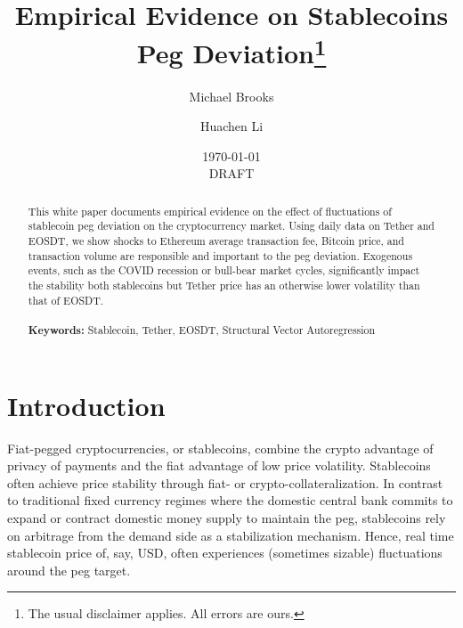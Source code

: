 \documentclass[12pt]{article}
\begin{document}
\begin{titlepage}
\title{Empirical Evidence on Stablecoins Peg Deviation\thanks{The usual disclaimer applies. All errors are ours.}}
\author{Michael Brooks \and Huachen Li}
\date{\today \\ DRAFT}


\maketitle
\begin{abstract}
\noindent This white paper documents empirical evidence on the effect of fluctuations of stablecoin peg deviation on the cryptocurrency market. Using daily data on Tether and EOSDT, we show shocks to Ethereum average transaction fee, Bitcoin price, and transaction volume are responsible and important to the peg deviation. Exogenous events, such as the COVID recession or bull-bear market cycles, significantly impact the stability both stablecoins but Tether price has an otherwise lower volatility than that of EOSDT.\\
\vspace{0in}\\
\noindent\textbf{Keywords:} Stablecoin, Tether, EOSDT, Structural Vector Autoregression\\

\bigskip
\end{abstract}
\setcounter{page}{0}
\thispagestyle{empty}
\end{titlepage}
\pagebreak \newpage




\doublespacing


\section{Introduction}
Fiat-pegged cryptocurrencies, or stablecoins, combine the crypto advantage of privacy of payments and the fiat advantage of low price volatility. Stablecoins often achieve price stability through fiat- or crypto-collateralization. In contrast to traditional fixed currency regimes where the domestic central bank commits to expand or contract domestic money supply to maintain the peg, stablecoins rely on arbitrage from the demand side as a stabilization mechanism. Hence, real time stablecoin price of, say, USD, often experiences (sometimes sizable) fluctuations around the peg target. 
\end{document}
